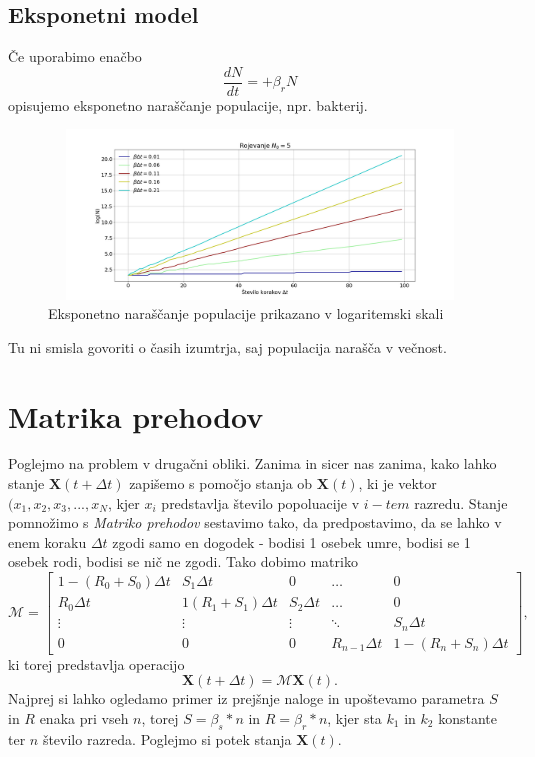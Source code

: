 \documentclass[11pt, a4paper]{article}
\renewcommand{\vec}[1]{\mathbf{#1}}
\begin{document}
 \subsection{Eksponetni model}
Če uporabimo enačbo
\begin{equation}
\frac{dN}{dt} = + \beta_r N
\end{equation}
opisujemo eksponetno naraščanje populacije, npr. bakterij.
\begin{figure}[H]
\centering

  \includegraphics[width=18cm, height=4.5cm]{Rojevanja_1.png}

  \caption{Eksponetno naraščanje populacije prikazano v logaritemski skali}
 \end{figure}
 Tu ni smisla govoriti o časih izumtrja, saj populacija narašča v večnost.
\section{Matrika prehodov}
Poglejmo na problem v drugačni obliki. Zanima in sicer nas zanima, kako lahko stanje $\vec{X}(t+\Delta t)$ zapišemo s pomočjo stanja ob $\vec{X}(t)$, ki je vektor $(x_1,x_2,x_3,...,x_N$, kjer $x_i$ predstavlja število popoluacije v $i-tem$ razredu. Stanje pomnožimo s \textit{Matriko prehodov} sestavimo tako, da predpostavimo, da se lahko v enem koraku $\Delta t$ zgodi samo en dogodek - bodisi 1 osebek umre, bodisi se 1 osebek rodi, bodisi se nič ne zgodi. Tako dobimo matriko
\[
\mathcal{M} = 
\begin{bmatrix}
    1 - (R_0+S_0)\Delta t  & S_1 \Delta t  & 0 & \dots  & 0 \\
    R_0 \Delta t & 1(R_1+S_1)\Delta t & S_2 \Delta t & \dots  & 0 \\
    \vdots & \vdots & \vdots & \ddots & S_n \Delta t \\
    0 & 0 & 0 & R_{n-1}\Delta t  & 1 - (R_n + S_n)\Delta t
\end{bmatrix},
\]
ki torej predstavlja operacijo 
\begin{equation}
\vec{X}(t+\Delta t) = \mathcal{M}\vec{X}(t).
\end{equation}
Najprej si lahko ogledamo primer iz prejšnje naloge in upoštevamo parametra $S$ in $R$ enaka pri vseh $n$, torej $S= \beta_s* n$ in $R= \beta_r* n$, kjer sta $k_1$ in $k_2 $ konstante ter $n$ število razreda.
Poglejmo si potek stanja $\vec{X}(t)$.
\end{document}
